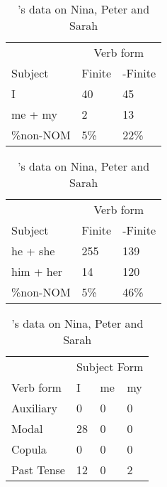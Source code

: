 \begin{table}[!]
    \caption{\cite{schutze1996subject}'s data on Nina, Peter and Sarah}
    \label{tab:ATOMSchutze}
   \begin{minipage}[t]{0.5\textwidth}
    \centering
    \begin{tabular}{@{}lll@{}}
        \toprule
         & \multicolumn{2}{c}{Verb form}\\
         \cline{2-3}
        Subject & Finite & -Finite \\
        \midrule
        I & 40 & 45 \\
        me + my & 2 & 13 \\
        \hline
        \%non-NOM & 5\% & 22\% \\
        \bottomrule
    \end{tabular}
\end{minipage}
\vspace{1ex}
\begin{minipage}[t]{0.5\textwidth}
    \centering
    \begin{tabular}{@{}lll@{}}
        \toprule
         & \multicolumn{2}{c}{Verb form}\\
         \cline{2-3}
        Subject & Finite & -Finite \\
        \midrule
        he + she & 255 & 139 \\
        him + her & 14 & 120 \\
        \hline
        \%non-NOM & 5\% & 46\% \\
    \bottomrule
    \end{tabular}
    \end{minipage}
\vspace{1ex}
    \begin{minipage}[t]{0.5\textwidth}
    \centering
    \begin{tabular}{@{}llll@{}}
        \toprule
            &\multicolumn{3}{c}{Subject Form}\\
            \cline{2-4}
        Verb form & I & me & my \\
        \midrule
        Auxiliary & 0 & 0 & 0 \\
        Modal & 28 & 0 & 0 \\
        Copula & 0 & 0 & 0 \\
        Past Tense & 12 & 0 & 2 \\

\end{tabular}
\end{minipage}
\end{table}
